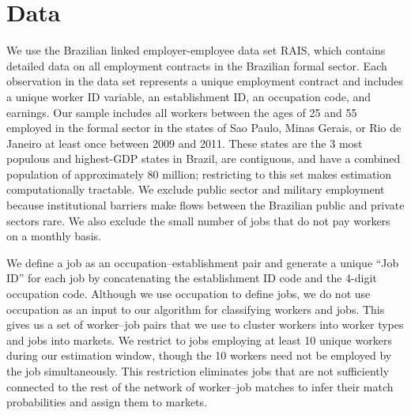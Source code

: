 \documentclass[12pt]{article}
\theoremstyle{definition}
\theoremstyle{plain}
\begin{document}

\section{Data} 
\label{sec:data}

We use the Brazilian linked employer-employee data set RAIS, which contains detailed data on all employment contracts in the Brazilian formal sector. Each observation in the data set represents a unique employment contract and includes a unique worker ID variable, an establishment ID, an occupation code, and earnings. Our sample includes all workers between the ages of 25 and 55 employed in the formal sector in the states of Sao Paulo, Minas Gerais, or Rio de Janeiro at least once between 2009 and 2011. These states are the 3 most populous and highest-GDP states in Brazil, are contiguous, and have a combined population of approximately 80 million; restricting to this set makes estimation computationally tractable.  We exclude public sector and military employment because institutional barriers make flows between the Brazilian public and private sectors rare. We also exclude the small number of jobs that do not pay workers on a monthly basis.

We define a job as an occupation--establishment pair and generate a unique ``Job ID'' for each job by concatenating the establishment ID code and the 4-digit occupation code.  Although we use occupation to define jobs, we do not use occupation as an input to our algorithm for classifying workers and jobs. This gives us a set of worker--job pairs that we use to cluster workers into worker types and jobs into markets. We restrict to jobs employing at least 10 unique workers during our estimation window, though the 10 workers need not be employed by the job simultaneously. This restriction eliminates jobs that are not sufficiently connected to the rest of the network of worker--job matches to infer their match probabilities and assign them to markets. 
\end{document}
